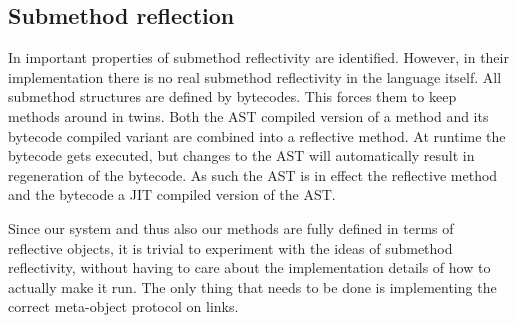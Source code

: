 \documentclass{article}
\begin{document}
\subsection{Submethod reflection}
In \cite{submethod reflectivity} important properties of submethod
reflectivity are identified. However, in their implementation there is
no real submethod reflectivity in the language itself. All submethod
structures are defined by bytecodes. This forces them to keep methods
around in twins. Both the AST compiled version of a method and
its bytecode compiled variant are combined into a reflective method.
At runtime the bytecode gets executed, but changes to the AST will
automatically result in regeneration of the bytecode. As such the AST
is in effect the reflective method and the bytecode a JIT compiled
version of the AST. 

Since our system and thus also our methods are fully defined in terms
of reflective objects, it is trivial to experiment with the ideas of
submethod reflectivity, without having to care about the
implementation details of how to actually make it run. The only thing
that needs to be done is implementing the correct meta-object protocol
on links.
\end{document}
